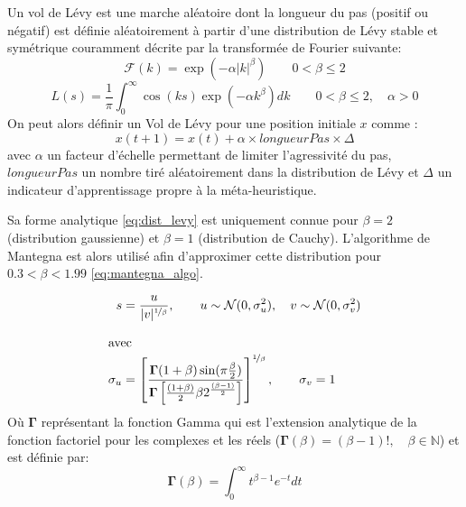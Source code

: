 \begin{Def}\label{def:vol_levy}
Un vol de Lévy est une marche aléatoire dont la longueur du pas (positif ou négatif)
est définie aléatoirement à partir d’une distribution de Lévy stable et symétrique
couramment décrite par la transformée de Fourier suivante:
\begin{equation}\label{eq:fourier_levy}
    \mathcal{F}(k) = \exp(-\alpha\mathopen{|}k\mathclose{|}^{\beta}) \qquad  0 < \beta \leq 2
\end{equation}
\begin{equation}\label{eq:dist_levy}
    L(s) = \frac{1}{\pi} \int_{0}^{\infty} \cos(k s)\exp(-\alpha k^{\beta}) dk \qquad  0 < \beta \leq 2,
           \quad \alpha > 0
\end{equation}
On peut alors définir un Vol de Lévy pour une position initiale $x$ comme :
\begin{equation}
  x(t + 1) = x(t) + \alpha \times longueurPas \times \Delta
\end{equation}
avec $\alpha$ un facteur d’échelle permettant de limiter l’agressivité du pas,
$longueurPas$ un nombre tiré aléatoirement dans la distribution de Lévy et $\Delta$
un indicateur d’apprentissage propre à la méta-heuristique.
\end{Def}

Sa forme analytique \eqref{eq:dist_levy} est uniquement connue pour $\beta = 2$
(distribution gaussienne) et $\beta = 1$ (distribution de Cauchy).
L’algorithme de Mantegna \parencite{Mantegna19944677} est alors utilisé afin
d’approximer cette distribution pour $0.3 < \beta < 1.99$ \eqref{eq:mantegna_algo}.

\begin{align}\label{eq:mantegna_algo}
    s &= \frac{u}{\mathopen{|}v\mathclose{|}^{\nicefrac{1}{\beta}}}, \qquad u \sim \mathcal{N}(0, \sigma_{u}^{2}),
        \quad v \sim \mathcal{N}(0, \sigma_{v}^{2}) \\[1em]
    \shortintertext{avec}
    \sigma_{u} &= \left[ \frac{\mathbf{\Gamma}(1+\beta)\sin(\pi\frac{\beta}{2})}%
                             {\mathbf{\Gamma} \left[\frac{(1+\beta)}{2}\beta
                              2^{\frac{(\beta-1)}{2}}\right]}\right]^{\nicefrac{1}{\beta}},%
    \qquad \sigma_{v} = 1 \notag
\end{align}
Où $\mathbf{\Gamma}$ représentant la fonction Gamma qui est l’extension analytique de la
fonction factoriel pour les complexes et les réels ($\mathbf{\Gamma}(\beta) = (\beta -1)!,\quad \beta\in \mathbb{N}$)
et est définie par:
\begin{equation*}
  \mathbf{\Gamma}(\beta) = \int_{0}^{\infty} t^{\beta-1}e^{-t} dt
\end{equation*}


